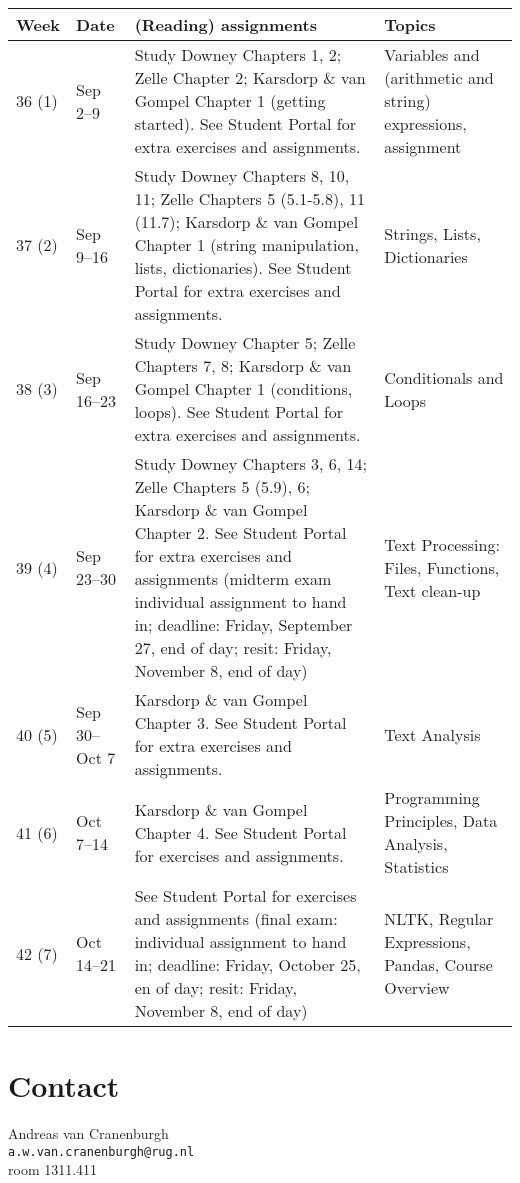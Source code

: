 \documentclass[a4paper,12pt]{article}
\begin{document}
\begin{longtable}{l l p{} p{} }
Week   & Date          & (Reading) assignments & Topics \\ \midrule

36 (1) & Sep 2--9 &
	Study Downey Chapters 1, 2;
	Zelle Chapter 2;
	Karsdorp \& van Gompel
	Chapter 1 (getting started).
	See Student Portal for extra exercises
	and assignments.
	& Variables and (arithmetic and string)
	expressions, assignment
	\\

37 (2) & Sep 9--16     &
	Study Downey Chapters 8, 10, 11;
	Zelle Chapters 5 (5.1-5.8), 11 (11.7);
	Karsdorp \& van Gompel Chapter 1
	(string manipulation, lists,
	dictionaries).
	See Student Portal for extra exercises
	and assignments.
	& Strings, Lists, Dictionaries
	\\

38 (3) & Sep 16--23    &
	Study Downey Chapter 5;
	Zelle Chapters 7, 8;
	Karsdorp \& van Gompel Chapter 1 (conditions, loops).
	See Student Portal for extra exercises
	and assignments.
	& Conditionals and Loops
	\\

39 (4) & Sep 23--30    &
	Study Downey Chapters 3, 6, 14;
	Zelle Chapters 5 (5.9), 6;
	Karsdorp \& van Gompel Chapter 2.
	See Student Portal for extra exercises
	and assignments (midterm exam
	individual assignment to hand in;
	deadline: Friday, September 27, end
	of day; resit: Friday, November 8, end
	of day)
	& Text Processing: Files, Functions, Text clean-up
	\\

40 (5) & Sep 30--Oct 7 &
	Karsdorp \& van Gompel Chapter 3.
	See Student Portal for extra exercises and assignments.
	& Text Analysis
	\\

41 (6) & Oct 7--14     &
	Karsdorp \& van Gompel Chapter 4.
	See Student Portal for exercises and assignments.
	& Programming Principles, Data Analysis, Statistics
	\\

42 (7) & Oct 14--21    &
	See Student Portal for exercises and
	assignments (final exam: individual
	assignment to hand in; deadline:
	Friday, October 25, en of day; resit:
	Friday, November 8, end of day)
	& NLTK, Regular Expressions, Pandas, Course Overview
	\\

\end{longtable}


\section{Contact}

Andreas van Cranenburgh\\
\texttt{a.w.van.cranenburgh@rug.nl} \\
room 1311.411
\end{document}
